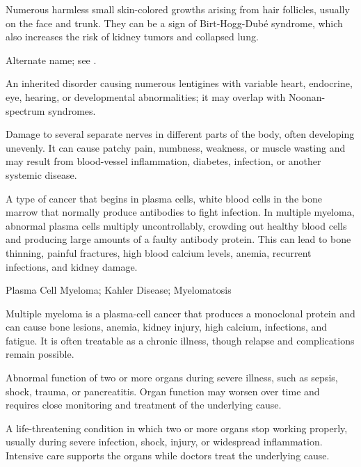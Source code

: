  Numerous harmless small skin-colored growths arising from hair follicles, usually on the face and trunk. They can be a sign of Birt-Hogg-Dubé syndrome, which also increases the risk of kidney tumors and collapsed lung.

 Alternate name; see .

 An inherited disorder causing numerous lentigines with variable heart, endocrine, eye, hearing, or developmental abnormalities; it may overlap with Noonan-spectrum syndromes.

 Damage to several separate nerves in different parts of the body, often developing unevenly. It can cause patchy pain, numbness, weakness, or muscle wasting and may result from blood-vessel inflammation, diabetes, infection, or another systemic disease.

 A type of cancer that begins in plasma cells, white blood cells in the bone marrow that normally produce antibodies to fight infection. In multiple myeloma, abnormal plasma cells multiply uncontrollably, crowding out healthy blood cells and producing large amounts of a faulty antibody protein. This can lead to bone thinning, painful fractures, high blood calcium levels, anemia, recurrent infections, and kidney damage.

\synonyms
Plasma Cell Myeloma; Kahler Disease; Myelomatosis

 Multiple myeloma is a plasma-cell cancer that produces a monoclonal protein and can cause bone lesions, anemia, kidney injury, high calcium, infections, and fatigue. It is often treatable as a chronic illness, though relapse and complications remain possible.

 Abnormal function of two or more organs during severe illness, such as sepsis, shock, trauma, or pancreatitis. Organ function may worsen over time and requires close monitoring and treatment of the underlying cause.

 A life-threatening condition in which two or more organs stop working properly, usually during severe infection, shock, injury, or widespread inflammation. Intensive care supports the organs while doctors treat the underlying cause.

